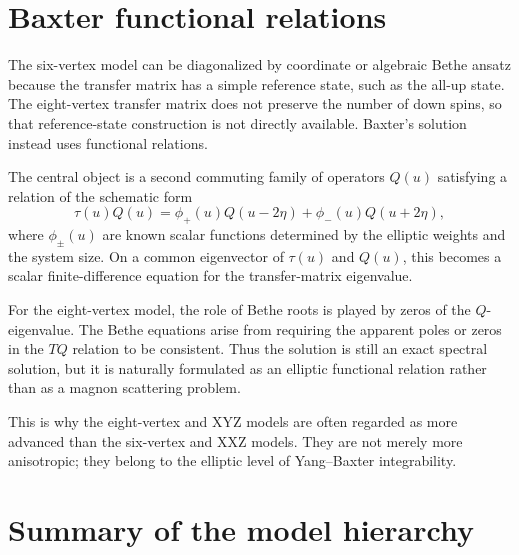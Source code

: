 \section{Baxter functional relations}
\label{sec:eight-vertex-functional-relations}

The six-vertex model can be diagonalized by coordinate or algebraic Bethe ansatz
because the transfer matrix has a simple reference state, such as the all-up
state.  The eight-vertex transfer matrix does not preserve the number of down
spins, so that reference-state construction is not directly available.
Baxter's solution instead uses functional relations.

The central object is a second commuting family of operators $Q(u)$ satisfying a
relation of the schematic form
\begin{equation}
\label{eq:eight-vertex-TQ-schematic}
    \tau(u)Q(u)
    =
    \phi_+(u)Q(u-2\eta)+\phi_-(u)Q(u+2\eta),
\end{equation}
where $\phi_{\pm}(u)$ are known scalar functions determined by the elliptic
weights and the system size.  On a common eigenvector of $\tau(u)$ and $Q(u)$,
this becomes a scalar finite-difference equation for the transfer-matrix
eigenvalue.

\begin{principle}
For the eight-vertex model, the role of Bethe roots is played by zeros of the
$Q$-eigenvalue.  The Bethe equations arise from requiring the apparent poles or
zeros in the $TQ$ relation to be consistent.  Thus the solution is still an
exact spectral solution, but it is naturally formulated as an elliptic functional
relation rather than as a magnon scattering problem.
\end{principle}

This is why the eight-vertex and XYZ models are often regarded as more advanced
than the six-vertex and XXZ models.  They are not merely more anisotropic; they
belong to the elliptic level of Yang--Baxter integrability.

\section{Summary of the model hierarchy}
\label{sec:eight-vertex-summary-hierarchy}

